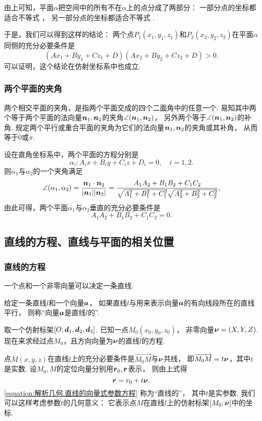 由上可知，平面\(\alpha\)把空间中的所有不在\(\alpha\)上的点分成了两部分：
一部分点的坐标都适合不等式 ，
另一部分点的坐标都适合不等式 .

于是，我们可以得到这样的结论：
两个点\(P_1(x_1,y_1,z_1)\)和\(P_2(x_2,y_2,z_2)\)在平面\(\alpha\)同侧的充分必要条件是\[
	(A x_1 + B y_1 + C z_1 + D) (A x_2 + B y_2 + C z_2 + D) > 0.
\]
可以证明，这个结论在仿射坐标系中也成立.

\subsubsection{两个平面的夹角}
两个相交平面的夹角，是指两个平面交成的四个二面角中的任意一个.
易知其中两个等于两个平面的法向量\(\boldsymbol{n}_1,\boldsymbol{n}_2\)的夹角\(\angle(\boldsymbol{n}_1,\boldsymbol{n}_2)\)，
另外两个等于\(\angle(\boldsymbol{n}_1,\boldsymbol{n}_2)\)的补角.
规定两个平行或重合平面的夹角为它们的法向量\(\boldsymbol{n}_1,\boldsymbol{n}_2\)的夹角或其补角，
从而等于\(0\)或\(\pi\).

设在直角坐标系中，两个平面的方程分别是\[
	\alpha_i:
	A_i x + B_i y + C_i z + D_i = 0,
	\quad i=1,2.
\]
则\(\alpha_1\)与\(\alpha_2\)的一个夹角满足\[
	\angle(\alpha_1,\alpha_2)
	= \frac{\boldsymbol{n}_1 \cdot \boldsymbol{n}_2}{\abs{\boldsymbol{n}_1} \abs{\boldsymbol{n}_2}}
	= \frac{A_1 A_2 + B_1 B_2 + C_1 C_2}{\sqrt{A_1^2 + B_1^2 + C_1^2} \sqrt{A_2^2 + B_2^2 + C_2^2}},
\]
由此可得，两个平面\(\alpha_1\)与\(\alpha_2\)垂直的充分必要条件是
\begin{equation}
	A_1 A_2 + B_1 B_2 + C_1 C_2 = 0.
\end{equation}

\subsection{直线的方程、直线与平面的相关位置}

\subsubsection{直线的方程}
一个点和一个非零向量可以决定一条直线.

给定一条直线\(l\)和一个向量\(\boldsymbol{a}\)，
如果直线\(l\)与用来表示向量\(\boldsymbol{a}\)的有向线段所在的直线平行，
则称“向量\(\boldsymbol{a}\)是直线\(l\)的”.

取一个仿射标架\([O;\boldsymbol{d}_1,\boldsymbol{d}_2,\boldsymbol{d}_3]\).
已知一点\(M_0(x_0,y_0,z_0)\)，
非零向量\(\boldsymbol{\nu}=(X,Y,Z)\).
现在来求经过点\(M_0\)，且方向向量为\(\boldsymbol{\nu}\)的直线\(l\)的方程.

点\(M(x,y,z)\)在直线\(l\)上的充分必要条件是\(\vec{M_0 M}\)与\(\boldsymbol{\nu}\)共线，
即\(\overrightarrow{M_0 M} = t \boldsymbol{\nu}\)，其中\(t\)是实数.
设\(M_0,M\)的定位向量分别用\(\boldsymbol{r}_0,\boldsymbol{r}\)表示，
则由上式得
\begin{equation}\label{equation:解析几何.直线的向量式参数方程}
	\boldsymbol{r} = r_0 + t \boldsymbol{\nu}.
\end{equation}
\cref{equation:解析几何.直线的向量式参数方程} 称为“直线的”，
其中\(t\)是实参数.
我们可以这样考虑参数\(t\)的几何意义：
它表示点\(M\)在直线\(l\)上的仿射标架\([M_0;\boldsymbol{\nu}]\)中的坐标.

